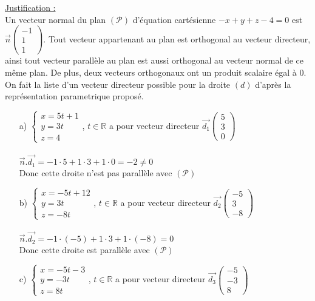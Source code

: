 \documentclass[a4paper, 12pt]{article}
\begin{document}
\noindent
\underline{Justification :}
\\
Un vecteur normal du plan $(\mathcal{P})$ d'équation cartésienne $ - x + y + z - 4 = 0$ est $\vec{n}\begin{pmatrix}-1 \\ 1 \\ 1\end{pmatrix}$.
Tout vecteur appartenant au plan est orthogonal au vecteur directeur, ainsi tout vecteur parallèle au plan est aussi orthogonal au vecteur normal de ce même plan.
De plus, deux vecteurs orthogonaux ont un produit scalaire égal à 0.
\\
On fait la liste d'un vecteur directeur possible pour la droite $(d)$ d'après la représentation parametrique proposé. 
\begin{itemize}
    \item[a)] $\begin{cases} x = 5t + 1 \\ y = 3t \\ z = 4 \end{cases}$, $t \in \mathds{R}$ a pour vecteur directeur $\vec{d_1}\begin{pmatrix} 5 \\ 3 \\ 0 \end{pmatrix}$ \\ \\ 
        $\vec{n}.\vec{d_1} = -1 \cdot 5 + 1 \cdot 3 + 1 \cdot 0 = -2 \neq 0$ \\ 
        Donc cette droite n'est pas parallèle avec $(\mathcal{P})$
    \item[b)] $\begin{cases} x = -5t +12 \\ y = 3t \\ z = -8t \end{cases}$, $t \in \mathds{R}$ a pour vecteur directeur $\vec{d_2}\begin{pmatrix} -5 \\ 3 \\ -8 \end{pmatrix}$ \\ \\ 
        $\vec{n}.\vec{d_2} = -1 \cdot (-5) + 1 \cdot 3 + 1 \cdot (-8) = 0$ \\ 
        Donc cette droite est parallèle avec $(\mathcal{P})$
    \item[c)] $\begin{cases} x = -5t - 3 \\ y = -3t \\ z = 8t \end{cases}$, $t \in \mathds{R}$ a pour vecteur directeur $\vec{d_3}\begin{pmatrix} -5 \\ -3 \\ 8 \end{pmatrix}$ \\ \\ 

\end{itemize}
\end{document}
